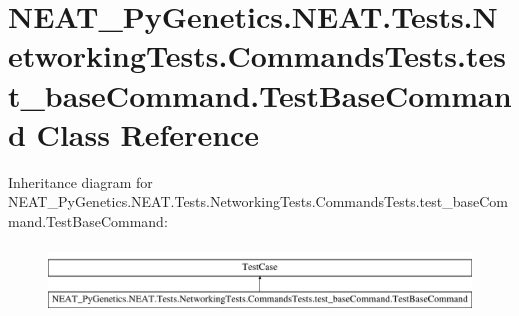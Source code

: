 \hypertarget{class_n_e_a_t___py_genetics_1_1_n_e_a_t_1_1_tests_1_1_networking_tests_1_1_commands_tests_1_1tese8fe8884dc3553b68bdb031db05dd839}{}\section{N\+E\+A\+T\+\_\+\+Py\+Genetics.\+N\+E\+A\+T.\+Tests.\+Networking\+Tests.\+Commands\+Tests.\+test\+\_\+base\+Command.\+Test\+Base\+Command Class Reference}
\label{class_n_e_a_t___py_genetics_1_1_n_e_a_t_1_1_tests_1_1_networking_tests_1_1_commands_tests_1_1tese8fe8884dc3553b68bdb031db05dd839}
Inheritance diagram for N\+E\+A\+T\+\_\+\+Py\+Genetics.\+N\+E\+A\+T.\+Tests.\+Networking\+Tests.\+Commands\+Tests.\+test\+\_\+base\+Command.\+Test\+Base\+Command\+:\begin{figure}[H]
\begin{center}
\leavevmode
\includegraphics[height=1.848185cm]{class_n_e_a_t___py_genetics_1_1_n_e_a_t_1_1_tests_1_1_networking_tests_1_1_commands_tests_1_1tese8fe8884dc3553b68bdb031db05dd839}
\end{center}
\end{figure}
